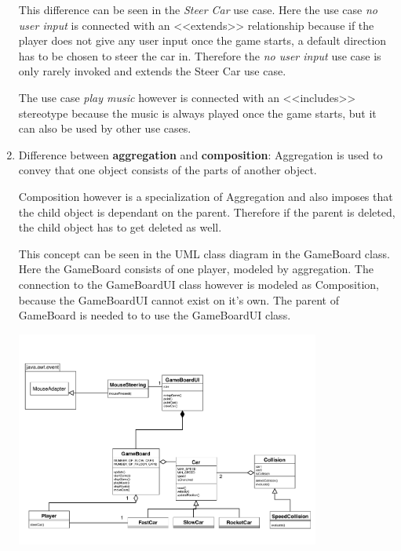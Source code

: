 \documentclass[a4paper, 10pt]{article}
\begin{document}
\begin{enumerate}
        This difference can be seen in the \textit{Steer Car} use case. Here the use case 
        \textit{no user input} is connected with an <<extends>> relationship because if
        the player does not give any user input once the game starts, a default 
        direction has to be chosen to steer the car in. Therefore the \textit{no user input}
        use case is only rarely invoked and extends the Steer Car use case.

        The use case \textit{play music} however is connected with an <<includes>> stereotype 
        because the music is always played once the game starts, but it can also be used by
        other use cases. 
    \item Difference between \textbf{aggregation} and \textbf{composition}:
        Aggregation is used to convey that one object consists of the parts of another object.

        Composition however is a specialization of Aggregation and also imposes that 
        the child object is dependant on the parent. Therefore if the parent is deleted, 
        the child object has to get deleted as well.

        This concept can be seen in the UML class diagram in the GameBoard class.
        Here the GameBoard consists of one player, modeled by aggregation.
        The connection to the GameBoardUI class however is modeled as Composition, 
        because the GameBoardUI cannot exist on it's own. The parent of GameBoard is needed to 
        to use the GameBoardUI class.

        \includegraphics[width=10cm] {../sheet02/object_model.pdf}

\end{enumerate}
\end{document}
